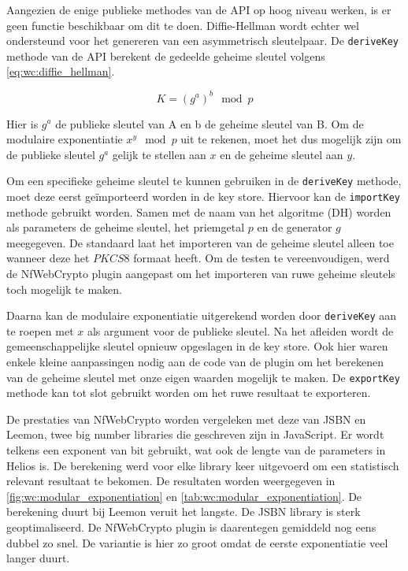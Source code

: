 \npar Aangezien de enige publieke methodes van de API op hoog niveau werken, is er geen functie beschikbaar om dit te doen. Diffie-Hellman wordt echter wel ondersteund voor het genereren van een asymmetrisch sleutelpaar. De \texttt{deriveKey} methode van de API berekent de gedeelde geheime sleutel volgens \ref{eq:wc:diffie_hellman}.\cite{diffie_hellman_new_directions_in_cryptography}

\begin{equation}
  \label{eq:wc:diffie_hellman}
  K = (g^a)^b \mod{p}
\end{equation}

\npar Hier is $g^a$ de publieke sleutel van A en b de geheime sleutel van B.  Om de modulaire exponentiatie $x^y \mod{p}$ uit te rekenen, moet het dus mogelijk zijn om de publieke sleutel $g^a$ gelijk te stellen aan $x$ en de geheime sleutel aan $y$.

\npar Om een specifieke geheime sleutel te kunnen gebruiken in de \texttt{deriveKey} methode, moet deze eerst ge\"importeerd worden in de key store. Hiervoor kan de \texttt{importKey} methode gebruikt worden. Samen met de naam van het algoritme (DH) worden als parameters de geheime sleutel, het priemgetal $p$ en de generator $g$ meegegeven. De standaard laat het importeren van de geheime sleutel alleen toe wanneer deze het $PKCS8$ formaat heeft.\cite{rfc5208} Om de testen te vereenvoudigen, werd de NfWebCrypto plugin aangepast om het importeren van ruwe geheime sleutels toch mogelijk te maken.

\npar Daarna kan de modulaire exponentiatie uitgerekend worden door \texttt{deriveKey} aan te roepen met $x$ als argument voor de publieke sleutel. Na het afleiden wordt de gemeenschappelijke sleutel opnieuw opgeslagen in de key store. Ook hier waren enkele kleine aanpassingen nodig aan de code van de plugin om het berekenen van de geheime sleutel met onze eigen waarden mogelijk te maken. De \texttt{exportKey} methode kan tot slot gebruikt worden om het ruwe resultaat te exporteren. 

\npar De prestaties van NfWebCrypto worden vergeleken met deze van JSBN en Leemon, twee big number libraries die geschreven zijn in JavaScript.\cite{site:wu_rsa_and_ecc_in_javascript}\cite{site:baird_big_integers_in_javascript} Er wordt telkens een exponent van  bit gebruikt, wat ook de lengte van de parameters in Helios is. De berekening werd voor elke library  keer uitgevoerd om een statistisch relevant resultaat te bekomen. De resultaten worden weergegeven in \ref{fig:wc:modular_exponentiation} en \ref{tab:wc:modular_exponentiation}. De berekening duurt bij Leemon veruit het langste. De JSBN library is sterk geoptimaliseerd. De NfWebCrypto plugin is daarentegen gemiddeld nog eens dubbel zo snel. De variantie is hier zo groot omdat de eerste exponentiatie veel langer duurt.

